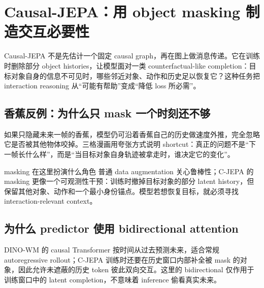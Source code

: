 \section{Causal-JEPA：用 object masking 制造交互必要性}

Causal-JEPA 不是先估计一个固定 causal graph，再在图上做消息传递。它在训练时删除部分 object histories，让模型面对一类 counterfactual-like completion：目标对象自身的信息不可见时，哪些邻近对象、动作和历史足以恢复它？这种任务把 interaction reasoning 从``可能有帮助''变成``降低 loss 所必需''。

\subsection{香蕉反例：为什么只 mask 一个时刻还不够}

如果只隐藏未来一帧的香蕉，模型仍可沿着香蕉自己的历史做速度外推，完全忽略它是否被其他物体咬掉。三格漫画用夸张方式说明 shortcut：真正的问题不是``下一帧长什么样''，而是``当目标对象自身轨迹被拿走时，谁决定它的变化''。



\begin{importantbox}{masking 在这里扮演什么角色}
普通 data augmentation 关心鲁棒性；C-JEPA 的 masking 更像一个可观测性干预：训练时撤掉目标对象的部分 latent history，但保留其他对象、动作和一个最小身份锚点。模型若想恢复目标，就必须寻找 interaction-relevant context。
\end{importantbox}

\subsection{为什么 predictor 使用 bidirectional attention}

DINO-WM 的 causal Transformer 按时间从过去预测未来，适合常规 autoregressive rollout；C-JEPA 训练时还要在历史窗口内部补全被 mask 的对象，因此允许未遮蔽的历史 token 彼此双向交互。这里的 bidirectional 仅作用于训练窗口中的 latent completion，不意味着 inference 偷看真实未来。


